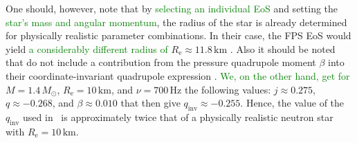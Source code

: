 \documentclass{aa}
\newcommand{\refe}[1]{\textcolor{green}{{#1}}}
\newcommand{\refedel}[1]{}
\newcommand{\Msun}{\ensuremath{M_{\odot}}}
\newcommand{\qinv}{\ensuremath{q_{\mathrm{inv}}}}
\begin{document}
One should, however, note that by \refe{selecting an individual EoS} and setting the \refe{star's mass and angular momentum}, the radius of the star is already determined for physically realistic parameter combinations.
In their case, the FPS EoS would yield \refe{a considerably different radius of} $R_{\mathrm{e}} \approx 11.8\,\mathrm{km}$ \citep{CST94, LP99}.
Also it should be noted that \citet{BPO13} do not include a contribution from the pressure quadrupole moment $\beta$ into their coordinate-invariant quadrupole expression \citep{PA12}.
\refe{We, on the other hand, get for} $M=1.4\,\Msun$, $R_{\mathrm{e}}=10\,\mathrm{km}$, and $\nu = 700\,\mathrm{Hz}$ the following values: 
$j \approx 0.275$, $q \approx -0.268$, and $\beta \approx 0.010$ that then give $\qinv \approx -0.255$.
Hence, the value of the $\qinv$ used in \citet{BPO13} is approximately twice that of a physically realistic neutron star with $R_{\mathrm{e}} = 10\,\mathrm{km}$.
\end{document}
